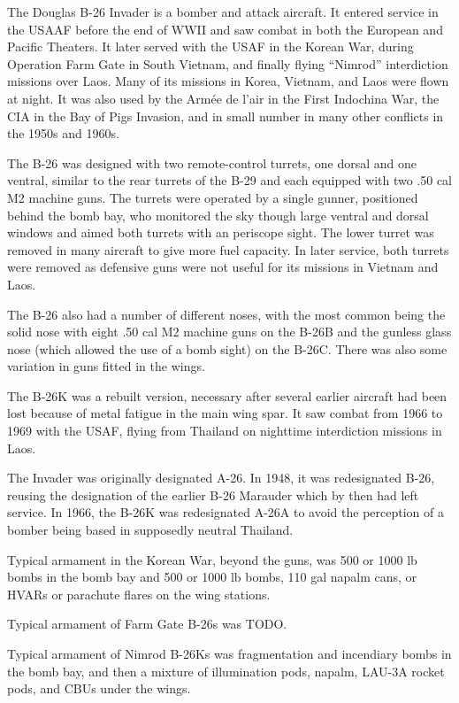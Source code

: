 
The Douglas B-26 Invader is a bomber and attack aircraft. It entered service in the USAAF before the end of WWII and saw combat in both the European and  Pacific Theaters. It later served with the USAF in the Korean War, during Operation Farm Gate in South Vietnam, and finally flying “Nimrod” interdiction missions over Laos. Many of its missions in Korea, Vietnam, and Laos were flown at night. It was also used by the Armée de l'air in the First Indochina War, the CIA in the Bay of Pigs Invasion, and in small number in many other conflicts in the 1950s and 1960s.

The B-26 was designed with two remote-control turrets, one dorsal and one ventral, similar to the rear turrets of the B-29 and each equipped with two .50 cal M2 machine guns. The turrets were operated by a single gunner, positioned behind the bomb bay, who monitored the sky though large ventral and dorsal windows and aimed both turrets with an periscope sight. The lower turret was removed in many aircraft to give more fuel capacity. In later service, both turrets were removed as defensive guns were not useful for its missions in Vietnam and Laos.

The B-26 also had a number of different noses, with the most common being the solid nose with eight .50 cal M2 machine guns on the B-26B and the gunless glass nose (which allowed the use of a bomb sight) on the B-26C. There was also some variation in guns fitted in the wings.

The B-26K was a rebuilt version, necessary after several earlier aircraft had been lost because of metal fatigue in the main wing spar. It saw combat from 1966 to 1969 with the USAF, flying from Thailand on nighttime interdiction missions in Laos.

The Invader was originally designated A-26. In 1948, it was redesignated B-26, reusing the designation of the earlier B-26 Marauder which by then had left service. In 1966, the B-26K was redesignated A-26A to avoid the perception of a bomber being based in supposedly neutral Thailand.

Typical armament in the Korean War, beyond the guns, was 500 or 1000 lb bombs in the bomb bay and 500 or 1000 lb bombs, 110 gal napalm cans, or HVARs or parachute flares on the wing stations.

Typical armament of Farm Gate B-26s was TODO.

Typical armament of Nimrod B-26Ks was fragmentation and incendiary bombs in the bomb bay, and then a mixture of illumination pods, napalm, LAU-3A rocket pods, and CBUs under the wings.

\begin{adclist}
\end{adclist}
